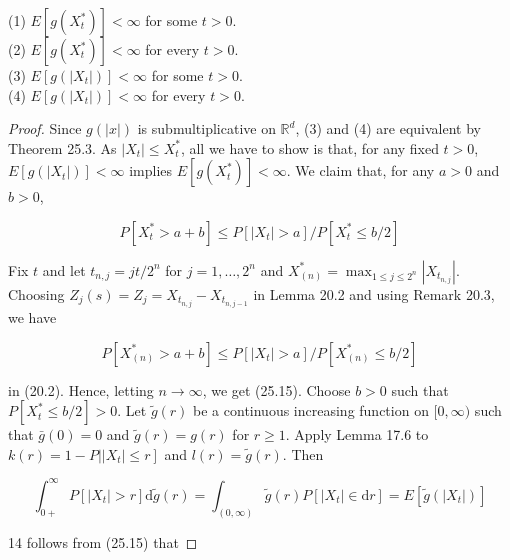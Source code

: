 \documentclass[a4paper,11pt]{article}
\begin{document}
(1) $E\left[g\left(X_{t}^{*}\right)\right]<\infty$ for some $t>0$. \\

(2) $E\left[g\left(X_{t}^{*}\right)\right]<\infty$ for every $t>0$. \\

(3) $E\left[g\left(\left|X_{t}\right|\right)\right]<\infty$ for some $t>0$. \\

(4) $E\left[g\left(\left|X_{t}\right|\right)\right]<\infty$ for every $t>0$. \\

\begin{proof}
    Since $g(|x|)$ is submultiplicative on $\mathbb{R}^{d}$, (3) and (4) are equivalent by
    Theorem 25.3. As $\left|X_{t}\right| \leq X_{t}^{*}$, all we have to show is that, for
    any fixed $t>0$, $E\left[g\left(\left|X_{t}\right|\right)\right]<\infty$ implies
    $E\left[g\left(X_{t}^{*}\right)\right]<\infty$. We claim that, for any $a>0$ and $b>0$,

    \begin{equation*}
        P\left[X_{t}^{*}>a+b\right] \leq P\left[\left|X_{t}\right|>a\right] / P\left[X_{t}^{*} \leq b / 2\right] \tag{25.15}
    \end{equation*}

    Fix $t$ and let $t_{n, j}=j t / 2^{n}$ for $j=1, \ldots, 2^{n}$ and $X_{(n)}^{*}=\max _{1 \leq j \leq 2^{n}}\left|X_{t_{n, j}}\right|$. Choosing $Z_{j}(s)=Z_{j}=X_{t_{n, j}}-X_{t_{n, j-1}}$ in Lemma 20.2 and using Remark 20.3, we have

    $$
        P\left[X_{(n)}^{*}>a+b\right] \leq P\left[\left|X_{t}\right|>a\right] / P\left[X_{(n)}^{*} \leq b / 2\right]
    $$

    in (20.2). Hence, letting $n \rightarrow \infty$, we get (25.15).
    Choose $b>0$ such that $P\left[X_{t}^{*} \leq b / 2\right]>0$.
    Let $\tilde{g}(r)$ be a continuous increasing function on $[0, \infty)$
                    such that $\bar{g}(0)=0$ and $\tilde{g}(r)=g(r)$ for $r \geq 1$.
                    Apply Lemma 17.6 to $\left.k(r)=1-P|| X_{t} \mid \leq r\right]$ and $l(r)=\tilde{g}(r)$. Then

    $$
        \int_{0+}^{\infty} P\left[\left|X_{t}\right|>r\right] \mathrm{d} \tilde{g}(r)=\int_{(0, \infty)} \tilde{g}(r) P\left[\left|X_{t}\right| \in \mathrm{d} r\right]=E\left[\widetilde{g}\left(\left|X_{t}\right|\right)\right]
    $$

    14 follows from (25.15) that


\end{proof}
\end{document}
